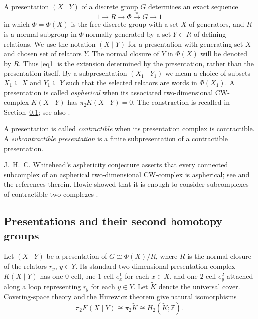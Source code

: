 \documentclass[11pt,a4paper]{article}
\begin{document}
A presentation $(X\mid Y)$ of a discrete group $G$ determines an exact sequence
\begin{equation}\label{eq1}
1 \rightarrow R \rightarrow \Phi \xrightarrow{\pi} G \rightarrow 1
\end{equation}
in which $\Phi=\Phi(X)$ is the free discrete group with a set $X$ of generators, and $R$
is a normal subgroup in $\Phi$ normally generated by a set $Y\subset R$ of defining relations. 
We use the notation $(X\mid Y)$ for a presentation with generating set $X$
and chosen set of relators $Y$.  The normal closure of $Y$ in $\Phi(X)$ will
be denoted by $R$.  Thus \eqref{eq1} is the extension determined by the
presentation, rather than the presentation itself.
By a subpresentation $(X_1\mid Y_1)$ we mean a choice of subsets
$X_1\subseteq X$ and $Y_1\subseteq Y$ such that the selected relators
are words in $\Phi(X_1)$.  A presentation is called \emph{aspherical}
when its associated two-dimensional CW-complex $K(X\mid Y)$ has
$\pi_2K(X\mid Y)=0$.  The construction is recalled in
Section~\ref{r1.2}; see also \cite{Hut}.

A presentation is called \emph{contractible} when its presentation complex is
contractible.  A \emph{subcontractible presentation} is a finite
subpresentation of a contractible presentation.

J.~H.~C. Whitehead's asphericity conjecture asserts that every connected
subcomplex of an aspherical two-dimensional CW-complex is aspherical; see
\cite{Ro} and the references therein.  Howie showed that it is enough to
consider subcomplexes of contractible two-complexes \cite{Ho83}.

\subsection{Presentations and their second homotopy groups}\label{r1.2}
Let $(X\mid Y)$ be a presentation of $G\cong\Phi(X)/R$, where $R$ is
the normal closure of the relators $r_y$, $y\in Y$.  Its standard
two-dimensional presentation complex $K(X\mid Y)$ has one $0$-cell, one
$1$-cell $e_x^1$ for each $x\in X$, and one $2$-cell $e_y^2$ attached along
a loop representing $r_y$ for each $y\in Y$.
Let $\widetilde K$ denote the universal cover.  Covering-space theory and the
Hurewicz theorem give natural isomorphisms
\[
 \pi_2K(X\mid Y)\cong\pi_2\widetilde K\cong H_2(\widetilde K;\mathbb Z).
\]
\end{document}
